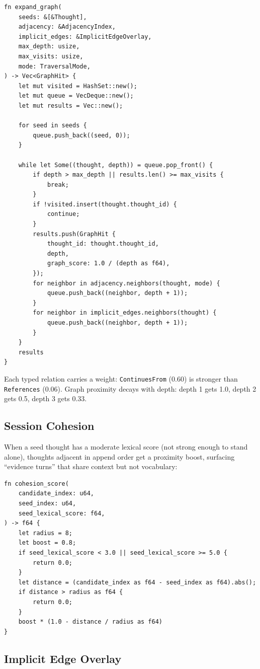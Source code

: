 \documentclass[11pt,a4paper]{article}
\begin{document}
\begin{lstlisting}
fn expand_graph(
    seeds: &[&Thought],
    adjacency: &AdjacencyIndex,
    implicit_edges: &ImplicitEdgeOverlay,
    max_depth: usize,
    max_visits: usize,
    mode: TraversalMode,
) -> Vec<GraphHit> {
    let mut visited = HashSet::new();
    let mut queue = VecDeque::new();
    let mut results = Vec::new();

    for seed in seeds {
        queue.push_back((seed, 0));
    }

    while let Some((thought, depth)) = queue.pop_front() {
        if depth > max_depth || results.len() >= max_visits {
            break;
        }
        if !visited.insert(thought.thought_id) {
            continue;
        }
        results.push(GraphHit {
            thought_id: thought.thought_id,
            depth,
            graph_score: 1.0 / (depth as f64),
        });
        for neighbor in adjacency.neighbors(thought, mode) {
            queue.push_back((neighbor, depth + 1));
        }
        for neighbor in implicit_edges.neighbors(thought) {
            queue.push_back((neighbor, depth + 1));
        }
    }
    results
}
\end{lstlisting}

Each typed relation carries a weight: \texttt{ContinuesFrom} (0.60) is stronger than
\texttt{References} (0.06). Graph proximity decays with depth: depth 1 gets 1.0, depth 2
gets 0.5, depth 3 gets 0.33.

\subsection{Session Cohesion}

When a seed thought has a moderate lexical score (not strong enough to stand alone),
thoughts adjacent in append order get a proximity boost, surfacing ``evidence turns'' that
share context but not vocabulary:

\begin{lstlisting}
fn cohesion_score(
    candidate_index: u64,
    seed_index: u64,
    seed_lexical_score: f64,
) -> f64 {
    let radius = 8;
    let boost = 0.8;
    if seed_lexical_score < 3.0 || seed_lexical_score >= 5.0 {
        return 0.0;
    }
    let distance = (candidate_index as f64 - seed_index as f64).abs();
    if distance > radius as f64 {
        return 0.0;
    }
    boost * (1.0 - distance / radius as f64)
}
\end{lstlisting}

\subsection{Implicit Edge Overlay}
\end{document}
